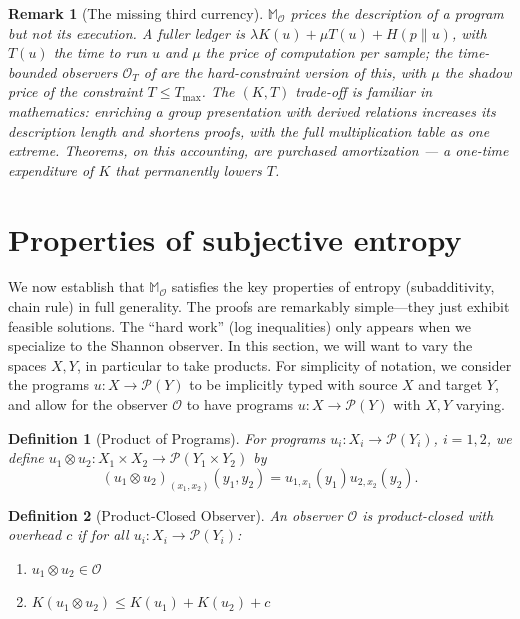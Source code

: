 \documentclass[11pt]{article}
\newtheorem{definition}{Definition}
\newtheorem{remark}{Remark}
\begin{document}
\begin{remark}[The missing third currency]
$\mathbb M_\mathcal{O}$ prices the description of a program but not its execution. A fuller ledger is $\lambda K(u) + \mu T(u) + H(p\|u)$, with $T(u)$ the time to run $u$ and $\mu$ the price of computation per sample; the time-bounded observers $\mathcal O_T$ of \cite{finzi2025} are the hard-constraint version of this, with $\mu$ the shadow price of the constraint $T \leq T_{\max}$. The $(K, T)$ trade-off is familiar in mathematics: enriching a group presentation with derived relations increases its description length and shortens proofs, with the full multiplication table as one extreme. Theorems, on this accounting, are purchased amortization --- a one-time expenditure of $K$ that permanently lowers $T$.
\end{remark}

\section{Properties of subjective entropy}

We now establish that $\mathbb{M}_\mathcal{O}$ satisfies the key properties of entropy
(subadditivity, chain rule) in full generality. The proofs are remarkably simple---they
just exhibit feasible solutions. The ``hard work'' (log inequalities) only appears when
we specialize to the Shannon observer. In this section, we will want to vary the spaces $X,Y$, in particular to take products. For simplicity of notation, we consider the programs $u:X\to \mathcal P(Y)$ to be implicitly typed with source $X$ and target $Y$, and allow for the observer $\mathcal O$ to have programs $u: X\to \mathcal P(Y)$ with $X,Y$ varying.

\begin{definition}[Product of Programs]
For programs $u_i: X_i \to \mathcal P(Y_i)$, $i = 1,2$, we define $u_1 \otimes u_2: X_1\times X_2 \to \mathcal P(Y_1\times Y_2)$ by
\[ (u_1\otimes u_2)_{(x_1,x_2)}(y_1,y_2) = u_{1,x_1}(y_1)u_{2,x_2}(y_2).\]
\end{definition}

\begin{definition}[Product-Closed Observer]
An observer $\mathcal{O}$ is \emph{product-closed with overhead $c$} if for all $u_i: X_i \to \mathcal P(Y_i)$:
\begin{enumerate}
    \item $u_1 \otimes u_2 \in \mathcal{O}$
    \item $K(u_1 \otimes u_2) \leq K(u_1) + K(u_2) + c$
\end{enumerate}
\end{definition}
\end{document}
